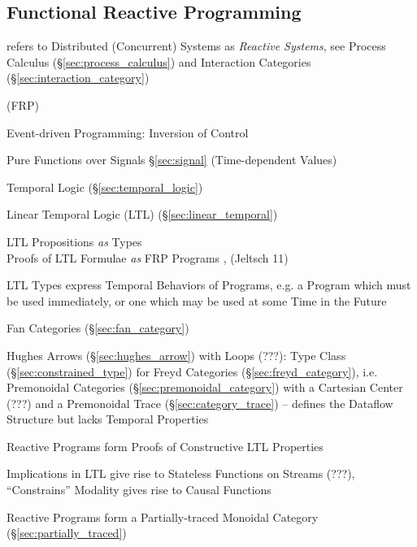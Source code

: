 \subsection{Functional Reactive Programming}\label{sec:frp}


\fist \cite{winskel-nielsen93} refers to Distributed (Concurrent)
Systems as \emph{Reactive Systems}, see Process Calculus
(\S\ref{sec:process_calculus}) and Interaction Categories
(\S\ref{sec:interaction_category})

(FRP)

Event-driven Programming: Inversion of Control %

Pure Functions over Signals \S\ref{sec:signal} (Time-dependent Values)

Temporal Logic (\S\ref{sec:temporal_logic})

Linear Temporal Logic (LTL) (\S\ref{sec:linear_temporal})

LTL Propositions \emph{as} Types \\
Proofs of LTL Formulae \emph{as} FRP Programs \cite{jeffrey12},
(Jeltsch 11)

LTL Types express Temporal Behaviors of Programs, e.g. a Program which
must be used immediately, or one which may be used at some Time in the
Future \cite{jeffrey12} %

Fan Categories (\S\ref{sec:fan_category}) \cite{jeltsch12}

Hughes Arrows (\S\ref{sec:hughes_arrow}) with Loops (???): Type Class
(\S\ref{sec:constrained_type}) for Freyd Categories
(\S\ref{sec:freyd_category}), i.e. Premonoidal Categories
(\S\ref{sec:premonoidal_category}) with a Cartesian Center (???) and a
Premonoidal Trace (\S\ref{sec:category_trace}) -- defines the Dataflow
Structure but lacks Temporal Properties \cite{jeffrey12}

Reactive Programs form Proofs of Constructive LTL Properties
\cite{jeffrey12}

Implications in LTL give rise to Stateless Functions on Streams (???),
``Constrains'' Modality gives rise to Causal Functions
\cite{jeffrey12} %

Reactive Programs form a Partially-traced Monoidal Category
(\S\ref{sec:partially_traced}) \cite{jeffrey12}


